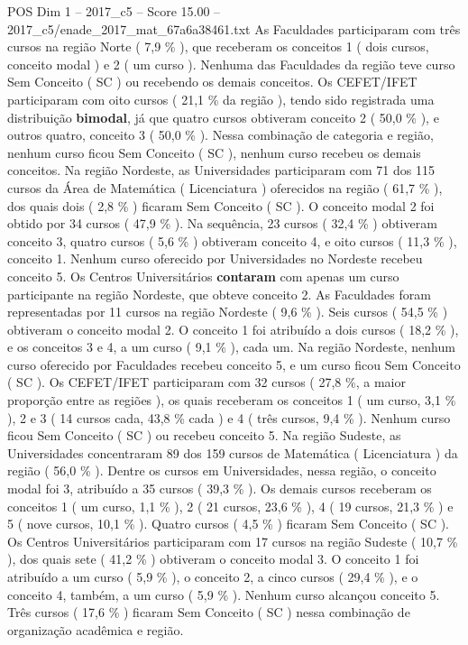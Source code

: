 \begin{textsample}{POS Dim 1 – 2017\_c5 – Score 15.00 – 2017\_c5/enade\_2017\_mat\_67a6a38461.txt}
As Faculdades participaram com três cursos na região Norte ( 7,9 \% ), que receberam os conceitos 1 ( dois cursos, conceito modal ) e 2 ( um curso ).
Nenhuma das Faculdades da região teve curso Sem Conceito ( SC ) ou recebendo os demais conceitos.
Os CEFET/IFET participaram com oito cursos ( 21,1 \% da região ), tendo sido registrada uma distribuição \textbf{bimodal}, já que quatro cursos obtiveram conceito 2 ( 50,0 \% ), e outros quatro, conceito 3 ( 50,0 \% ).
Nessa combinação de categoria e região, nenhum curso ficou Sem Conceito ( SC ), nenhum curso recebeu os demais conceitos.
Na região Nordeste, as Universidades participaram com 71 dos 115 cursos da Área de Matemática ( Licenciatura ) oferecidos na região ( 61,7 \% ), dos quais dois ( 2,8 \% ) ficaram Sem Conceito ( SC ).
O conceito modal 2 foi obtido por 34 cursos ( 47,9 \% ).
Na sequência, 23 cursos ( 32,4 \% ) obtiveram conceito 3, quatro cursos ( 5,6 \% ) obtiveram conceito 4, e oito cursos ( 11,3 \% ), conceito 1.
Nenhum curso oferecido por Universidades no Nordeste recebeu conceito 5.
Os Centros Universitários \textbf{contaram} com apenas um curso participante na região Nordeste, que obteve conceito 2.
As Faculdades foram representadas por 11 cursos na região Nordeste ( 9,6 \% ).
Seis cursos ( 54,5 \% ) obtiveram o conceito modal 2.
O conceito 1 foi atribuído a dois cursos ( 18,2 \% ), e os conceitos 3 e 4, a um curso ( 9,1 \% ), cada um.
Na região Nordeste, nenhum curso oferecido por Faculdades recebeu conceito 5, e um curso ficou Sem Conceito ( SC ).
Os CEFET/IFET participaram com 32 cursos ( 27,8 \%, a maior proporção entre as regiões ), os quais receberam os conceitos 1 ( um curso, 3,1 \% ), 2 e 3 ( 14 cursos cada, 43,8 \% cada ) e 4 ( três cursos, 9,4 \% ).
Nenhum curso ficou Sem Conceito ( SC ) ou recebeu conceito 5.
Na região Sudeste, as Universidades concentraram 89 dos 159 cursos de Matemática ( Licenciatura ) da região ( 56,0 \% ).
Dentre os cursos em Universidades, nessa região, o conceito modal foi 3, atribuído a 35 cursos ( 39,3 \% ).
Os demais cursos receberam os conceitos 1 ( um curso, 1,1 \% ), 2 ( 21 cursos, 23,6 \% ), 4 ( 19 cursos, 21,3 \% ) e 5 ( nove cursos, 10,1 \% ).
Quatro cursos ( 4,5 \% ) ficaram Sem Conceito ( SC ).
Os Centros Universitários participaram com 17 cursos na região Sudeste ( 10,7 \% ), dos quais sete ( 41,2 \% ) obtiveram o conceito modal 3.
O conceito 1 foi atribuído a um curso ( 5,9 \% ), o conceito 2, a cinco cursos ( 29,4 \% ), e o conceito 4, também, a um curso ( 5,9 \% ).
Nenhum curso alcançou conceito 5.
Três cursos ( 17,6 \% ) ficaram Sem Conceito ( SC ) nessa combinação de organização acadêmica e região.

\end{textsample}

